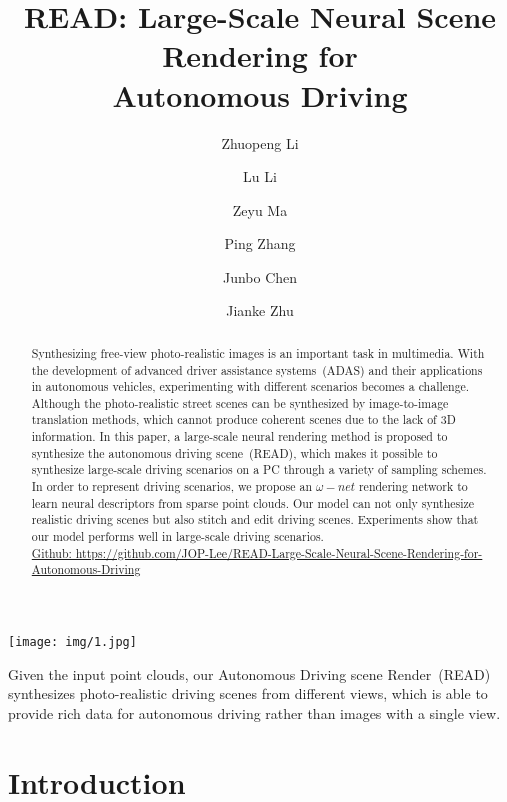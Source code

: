 \documentclass[sigconf]{acmart}
\author{Zhuopeng Li}
\affiliation{\institution{Zhejiang University}
   \country{China}}
\author{Lu Li}
\affiliation{\institution{Zhejiang University}
   \country{China}}
\author{Zeyu Ma}
\affiliation{\institution{Alibaba Group}
   \country{China}}
\author{Ping Zhang}
\affiliation{\institution{Alibaba Group}
   \country{China}}
\author{Junbo Chen}
\affiliation{\institution{Alibaba Group}
   \country{China}}
\author{Jianke Zhu}
\affiliation{\institution{Zhejiang University}
   \country{China}}
\begin{document}
\title{READ: Large-Scale Neural Scene Rendering for \\ Autonomous Driving}







\begin{abstract}
Synthesizing free-view photo-realistic images is an important task in multimedia. With the development of advanced driver assistance systems~(ADAS) and their applications in autonomous vehicles, experimenting with different scenarios becomes a challenge. Although the photo-realistic street scenes can be synthesized by image-to-image translation methods, which cannot produce coherent scenes due to the lack of 3D information. In this paper, a large-scale neural rendering method is proposed to synthesize the autonomous driving scene~(READ), which makes it possible to synthesize large-scale driving scenarios on a PC through a variety of sampling schemes. In order to represent driving scenarios, we propose an $\omega-net$ rendering network to learn neural descriptors from sparse point clouds. Our model can not only synthesize realistic driving scenes but also stitch and edit driving scenes. Experiments show that our model performs well in large-scale driving scenarios. \\


\href{https://github.com/JOP-Lee/READ-Large-Scale-Neural-Scene-Rendering-for-Autonomous-Driving}{Github:  https://github.com/JOP-Lee/READ-Large-Scale-Neural-Scene-Rendering-for-Autonomous-Driving}
\end{abstract}








\begin{teaserfigure}
\centering
\texttt{[image: img/1.jpg]}  
  \caption{Given the input point clouds, our Autonomous Driving scene Render~(READ) synthesizes photo-realistic driving scenes from different views, which is able to provide rich data for autonomous driving rather than images with a single view.}
  \label{fig:label1}
\end{teaserfigure}

\maketitle

\section{Introduction}
\end{document}
